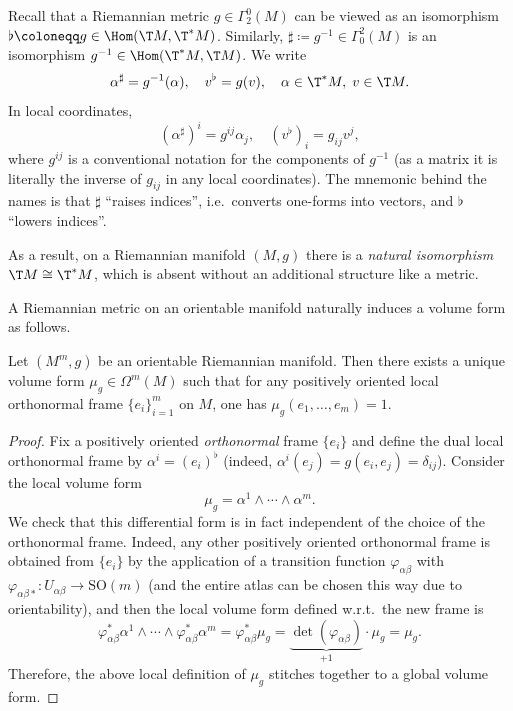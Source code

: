 \begin{defn}
    Recall that a Riemannian metric $g\in\Gamma^0_2(M)$ can be viewed as an isomorphism $\flat\coloneqq g\in\Hom(\T M,\T^\ast M)$. Similarly, $\sharp\coloneqq g^{-1}\in\Gamma_0^2(M)$ is an isomorphism $g^{-1}\in\Hom(\T^\ast M,\T M)$. We write 
    \[\alpha^\sharp=g^{-1}(\alpha),\quad v^\flat=g(v),\quad \alpha\in \T^\ast M,\;v\in \T M.\]
    In local coordinates,
    \[(\alpha^\sharp)^i=g^{ij}\alpha_j,\quad (v^\flat)_i=g_{ij}v^j,\]
    where $g^{ij}$ is a conventional notation for the components of $g^{-1}$ (as a matrix it is literally the inverse of $g_{ij}$ in any local coordinates). The mnemonic behind the names is that $\sharp$ ``raises indices'', i.e.\ converts one-forms into vectors, and $\flat$ ``lowers indices''.
    
    As a result, on a Riemannian manifold $(M,g)$ there is a \emph{natural isomorphism} $\T M\cong \T^\ast M$, which is absent without an additional structure like a metric.
\end{defn}


A Riemannian metric on an orientable manifold naturally induces a volume form as follows.


\begin{thm}
    Let $(M^m,g)$ be an orientable Riemannian manifold. Then there exists a unique volume form $\mu_g\in\Omega^m(M)$ such that for any positively oriented local orthonormal frame $\{e_i\}_{i=1}^m$ on $M$, one has $\mu_g(e_1,\ldots,e_m)=1$.
\end{thm}
\begin{proof}
    Fix a positively oriented \emph{orthonormal} frame $\{e_i\}$ and define the dual local orthonormal frame by $\alpha^i=(e_i)^\flat$ (indeed, $\alpha^i(e_j)=g(e_i,e_j)=\delta_{ij}$). Consider the local volume form
    \[\mu_g=\alpha^1\wedge \cdots\wedge \alpha^m.\]
    We check that this differential form is in fact independent of the choice of the orthonormal frame. Indeed, any other positively oriented orthonormal frame is obtained from $\{e_i\}$ by the application of a transition function $\varphi_{\alpha\beta}$ with $\varphi_{\alpha\beta\ast}:U_{\alpha\beta}\to \mathrm{SO}(m)$ (and the entire atlas can be chosen this way due to orientability), and then the local volume form defined w.r.t.\ the new frame is
    \[\varphi_{\alpha\beta}^\ast\alpha^1\wedge\cdots\wedge\varphi_{\alpha\beta}^\ast\alpha^m=\varphi_{\alpha\beta}^\ast \mu_g=\underbrace{\det(\varphi_{\alpha\beta})}_{+1}\cdot\mu_g=\mu_g.\]
    Therefore, the above local definition of $\mu_g$ stitches together to a global volume form.
\end{proof}

